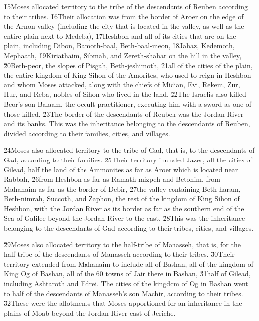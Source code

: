 \v{15}Moses allocated territory to the tribe of the descendants of Reuben according to their tribes. \v{16}Their allocation was from the border of Aroer on the edge of the Arnon valley (including the city that is located in the valley, as well as the entire plain next to Medeba), \v{17}Heshbon and all of its cities that are on the plain, including Dibon, Bamoth-baal, Beth-baal-meon, \v{18}Jahaz, Kedemoth, Mephaath, \v{19}Kiriathaim, Sibmah, and Zereth-shahar on the hill in the valley, \v{20}Beth-peor, the slopes of Pisgah, Beth-jeshimoth, \v{21}all of the cities of the plain, the entire kingdom of King Sihon of the Amorites, who used to reign in Heshbon and whom Moses attacked, along with the chiefs of Midian, Evi, Rekem, Zur, Hur, and Reba, nobles of Sihon who lived in the land. \v{22}The Israelis also killed Beor's son Balaam, the occult practitioner, executing him with a sword as one of those killed. \v{23}The border of the descendants of Reuben was the Jordan River and its banks. This was the inheritance belonging to the descendants of Reuben, divided according to their families, cities, and villages.

\v{24}Moses also allocated territory to the tribe of Gad, that is, to the descendants of Gad, according to their families. \v{25}Their territory included Jazer, all the cities of Gilead, half the land of the Ammonites as far as Aroer which is located near Rabbah, \v{26}from Heshbon as far as Ramath-mizpeh and Betonim, from Mahanaim as far as the border of Debir, \v{27}the valley containing Beth-haram, Beth-nimrah, Succoth, and Zaphon, the rest of the kingdom of King Sihon of Heshbon, with the Jordan River as its border as far as the southern end of the Sea of Galilee beyond the Jordan River to the east. \v{28}This was the inheritance belonging to the descendants of Gad according to their tribes, cities, and villages.

\v{29}Moses also allocated territory to the half-tribe of Manasseh, that is, for the half-tribe of the descendants of Manasseh according to their tribes. \v{30}Their territory extended from Mahanaim to include all of Bashan, all of the kingdom of King Og of Bashan, all of the 60 towns of Jair there in Bashan, \v{31}half of Gilead, including Ashtaroth and Edrei. The cities of the kingdom of Og in Bashan went to half of the descendants of Manasseh's son Machir, according to their tribes. \v{32}These were the allotments that Moses apportioned for an inheritance in the plains of Moab beyond the Jordan River east of Jericho.

